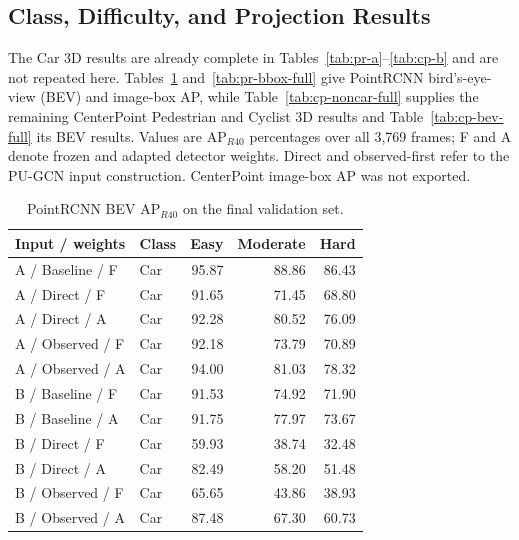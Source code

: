 \subsection{Class, Difficulty, and Projection Results}
\label{sec:kitti-full}

The Car 3D results are already complete in
Tables~\ref{tab:pr-a}--\ref{tab:cp-b} and are not repeated here.
Tables~\ref{tab:pr-bev-full} and~\ref{tab:pr-bbox-full} give PointRCNN
bird's-eye-view (BEV) and image-box AP, while
Table~\ref{tab:cp-noncar-full} supplies the remaining CenterPoint
Pedestrian and Cyclist 3D results and Table~\ref{tab:cp-bev-full}
its BEV results. Values are AP$_{R40}$ percentages over all 3,769
frames; F and A denote frozen and adapted detector weights.
Direct and observed-first refer to the PU-GCN input construction.
CenterPoint image-box AP was not exported.

\begin{table}[!t]\centering
\begin{tabular}{llrrr}\toprule
Input / weights & Class & Easy & Moderate & Hard\\\midrule
A / Baseline / F & Car & 95.87 & 88.86 & 86.43 \\
A / Direct / F & Car & 91.65 & 71.45 & 68.80 \\
A / Direct / A & Car & 92.28 & 80.52 & 76.09 \\
A / Observed / F & Car & 92.18 & 73.79 & 70.89 \\
A / Observed / A & Car & 94.00 & 81.03 & 78.32 \\
B / Baseline / F & Car & 91.53 & 74.92 & 71.90 \\
B / Baseline / A & Car & 91.75 & 77.97 & 73.67 \\
B / Direct / F & Car & 59.93 & 38.74 & 32.48 \\
B / Direct / A & Car & 82.49 & 58.20 & 51.48 \\
B / Observed / F & Car & 65.65 & 43.86 & 38.93 \\
B / Observed / A & Car & 87.48 & 67.30 & 60.73 \\
\bottomrule\end{tabular}
\caption{PointRCNN BEV AP$_{R40}$ on the final validation set.}\label{tab:pr-bev-full}
\end{table}

